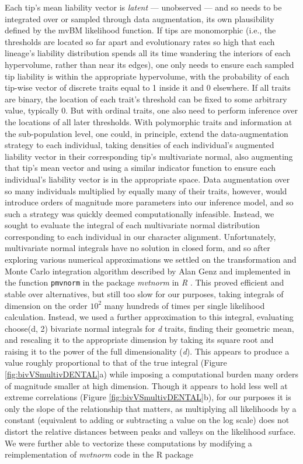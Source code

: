 Each tip's mean liability vector is \textit{latent} --- unobserved --- and so needs to be integrated over or sampled through data augmentation, its own plausibility defined by the mvBM likelihood function. If tips are monomorphic (i.e., the thresholds are located so far apart and evolutionary rates so high that each lineage's liability distribution spends all its time wandering the interiors of each hypervolume, rather than near its edges), one only needs to ensure each sampled tip liability is within the appropriate hypervolume, with the probability of each tip-wise vector of discrete traits equal to 1 inside it and 0 elsewhere. If all traits are binary, the location of each trait's threshold can be fixed to some arbitrary value, typically 0. But with ordinal traits, one also need to perform inference over the locations of all later thresholds. With polymorphic traits and information at the sub-population level, one could, in principle, extend the data-augmentation strategy to each individual, taking densities of each individual's augmented liability vector in their corresponding tip's multivariate normal, also augmenting that tip's mean vector and using a similar indicator function to ensure each individual's liability vector is in the appropriate space. Data augmentation over so many individuals multiplied by equally many of their traits, however, would introduce orders of magnitude more parameters into our inference model, and so such a strategy was quickly deemed computationally infeasible. Instead, we sought to evaluate the integral of each multivariate normal distribution corresponding to each individual in our character alignment. Unfortunately, multivariate normal integrals have no solution in closed form, and so after exploring various numerical approximations we settled on the transformation and Monte Carlo integration algorithm described by Alan Genz \citep{genzNumericalComputationMultivariate1992} and implemented in the function \texttt{pmvnorm} in the package \textit{mvtnorm} \citep{genzPackageMvtnorm2020} in \textit{R} \citep{rcoreteamLanguageEnvironmentStatistical2013}. This proved efficient and stable over alternatives, but still too slow for our purposes, taking integrals of dimension on the order $10^2$ many hundreds of times per single likelihood calculation. Instead, we used a further approximation to this integral, evaluating choose(d, 2) bivariate normal integrals for \textit{d} traits, finding their geometric mean, and rescaling it to the appropriate dimension by taking its square root and raising it to the power of the full dimensionality (\textit{d}). This appears to produce a value roughly proportional to that of the true integral (Figure \ref{fig:bivVSmultivDENTAL}a) while imposing a computational burden many orders of magnitude smaller at high dimension. Though it appears to hold less well at extreme correlations (Figure \ref{fig:bivVSmultivDENTAL}b), for our purposes it is only the slope of the relationship that matters, as multiplying all likelihoods by a constant (equivalent to adding or subtracting a value on the log scale) does not distort the relative distances between peaks and valleys on the likelihood surface. We were further able to vectorize these computations by modifying a reimplementation of \textit{mvtnorm} code in the R package 